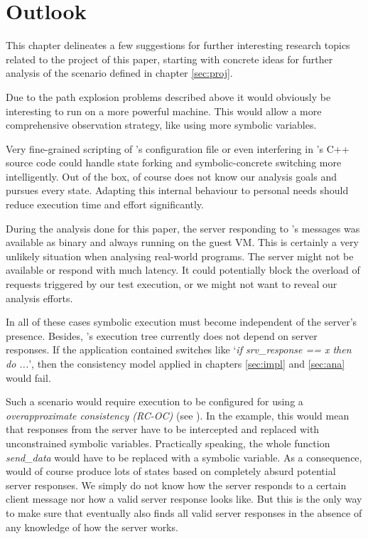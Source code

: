 \section{Outlook}\label{sec:outlook}

This chapter delineates a few suggestions for further interesting research topics related to the project of this paper, starting with concrete ideas for further analysis of the scenario defined in chapter \ref{sec:proj}.

\medskip
Due to the path explosion problems described above it would obviously be interesting to run \sse on a more powerful machine.
This would allow a more comprehensive observation strategy, like using more symbolic variables.

\medskip
Very fine-grained scripting of \sse's configuration file or even interfering in \sse's C++ source code could handle state forking and symbolic-concrete switching more intelligently.
Out of the box, \sse of course does not know our analysis goals and pursues every state.
Adapting this internal behaviour to personal needs should reduce execution time and effort significantly.

\medskip
During the analysis done for this paper, the server responding to \app's messages was available as binary and always running on the guest VM.
This is certainly a very unlikely situation when analysing real-world programs.
The server might not be available or respond with much latency.
It could potentially block the overload of requests triggered by our test execution, or we might not want to reveal our analysis efforts.

In all of these cases symbolic execution must become independent of the server's presence.
Besides, \app's execution tree currently does not depend on server responses.
If the application contained switches like `\textit{if srv\_response == x then do ...}', then the consistency model applied in chapters \ref{sec:impl} and \ref{sec:ana} would fail.

Such a scenario would require \sse execution to be configured for using a \textit{overapproximate consistency (RC-OC)} (see \cite[p.~26ff]{chip14s2e}).
In the \app example, this would mean that responses from the server have to be intercepted and replaced with unconstrained symbolic variables.
Practically speaking, the whole function \textit{send\_data} would have to be replaced with a symbolic variable.
As a consequence, \sse would of course produce lots of states based on completely absurd potential server responses.
We simply do not know how the server responds to a certain client message nor how a valid server response looks like.
But this is the only way to make sure that \sse eventually also finds all valid server responses in the absence of any knowledge of how the server works. 


